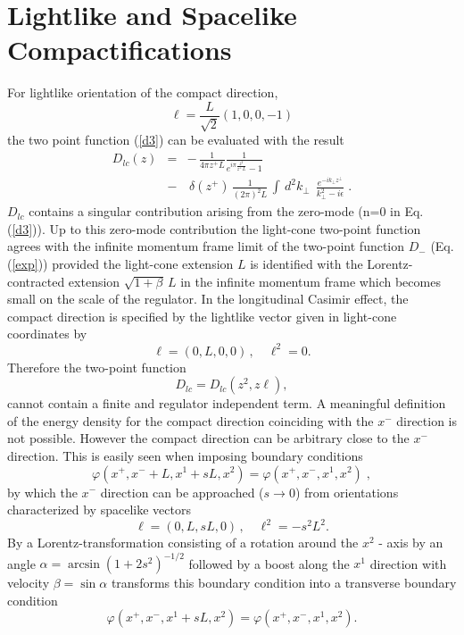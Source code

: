 \documentclass[a4paper,twocolumn,eqsecnum,aps]{revtex4}
\begin{document}


\section{Lightlike and Spacelike Compactifications}
 For lightlike orientation of the compact direction,  
$$\ell = \frac{L}{\sqrt{2}}(1,0,0,-1)$$
the  two point function (\ref{d3})  can be evaluated with the result
\begin{eqnarray}
  \label{dlc1}
D_{lc} (z) &=& -\,\frac{1}{4 \pi z^{+} L} \frac{1}{ e^{i \pi \frac{z^{2}}{z^{+} \, L}}-1 }  \nonumber\\
&-&\,\delta (z^{+}) \, \frac{1}{(2 \pi) ^{2}L} \,\int \, d^{2} k_{\perp} \; \, \frac{ e^{- i k_{\perp} z^{\perp} }}{  k^{2}_{\perp}- i \epsilon} \;.  
\end{eqnarray}
$D_{lc}$ contains a singular contribution arising from the zero-mode (n=0 in Eq.(\ref{d3})). Up to this zero-mode contribution the light-cone two-point function agrees with the infinite momentum frame limit of the two-point function $D_{-}$ (Eq.(\ref{exp})) provided  the light-cone extension $L$ is identified with the Lorentz-contracted extension $\sqrt{1+\beta } \, L$ in the infinite momentum frame which  becomes small on the scale of the regulator.
In the longitudinal Casimir effect,  the compact direction is specified by the lightlike vector given in light-cone coordinates by 
$$\ell = (0,L,0,0) \, ,\quad \ell^{2} = 0.$$ 
Therefore the two-point function  
$$D_{lc}= D_{lc}(z^2, z\ell ),$$
cannot contain a finite and regulator independent term. A meaningful definition of the energy density for the compact direction  coinciding with the $x^{-}$ direction is not possible. However the compact direction can be arbitrary close to the $x^{-}$ direction. This is easily seen when 
 imposing   boundary conditions  
\begin{equation}
  \label{bcp}
  \varphi(x^+,x^-+L,x^1+sL,x^2)= \varphi(x^+,x^-,x^1,x^2) \;,
\end{equation}
by which the $x^{-}$ direction can be approached ($s \rightarrow 0$) from orientations characterized by spacelike vectors
$$\ell = (0,L,sL,0)\, ,\quad \ell^{2} = -s^2 L^2 . $$
By a Lorentz-transformation consisting of a rotation around the $x^2$ - axis by an angle $\alpha=\arcsin (1+2s^2)^{-1/2}$ followed by a boost along the $x^1$ direction with velocity $\beta =\sin \alpha$ transforms this boundary condition into  a transverse boundary condition
\begin{equation}
  \label{bcpp}
  \varphi(x^+,x^-,x^1+sL,x^2)= \varphi(x^+,x^-,x^1,x^2) .
\end{equation}
\end{document}
